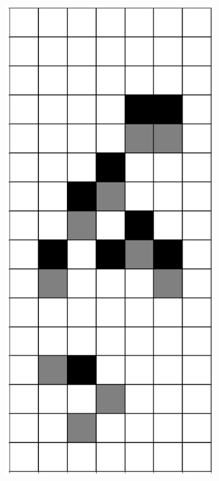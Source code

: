 \documentclass[12pt]{article}
\numberwithin{figure}{section} %
\begin{document}
\begin{figure}[H]
\begin{subfigure}{0.18\textwidth}
     		\subcaption{}
   	\end{subfigure}
        \begin{subfigure}{0.18\textwidth}
     		\centering
     		\includegraphics[width=\linewidth]{Section4/19.2}

\end{subfigure}
\end{figure}
\end{document}
